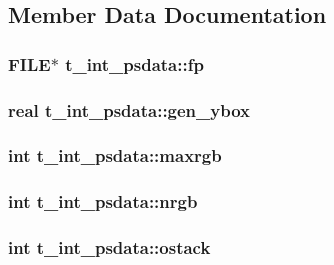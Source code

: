 \subsection{\-Member \-Data \-Documentation}
\hypertarget{structt__int__psdata_a721deeef5b4b3ea353a130fcd3f75b23}{
\subsubsection[{fp}]{\setlength{\rightskip}{0pt plus 5cm}\-F\-I\-L\-E$\ast$ {\bf t\-\_\-int\-\_\-psdata\-::fp}}}\label{structt__int__psdata_a721deeef5b4b3ea353a130fcd3f75b23}
\hypertarget{structt__int__psdata_ad8d5de42bdd642b16f28f3de1a23f2ff}{
\subsubsection[{gen\-\_\-ybox}]{\setlength{\rightskip}{0pt plus 5cm}real {\bf t\-\_\-int\-\_\-psdata\-::gen\-\_\-ybox}}}\label{structt__int__psdata_ad8d5de42bdd642b16f28f3de1a23f2ff}
\hypertarget{structt__int__psdata_aff2dd0eb6e65ee295c467b080add2ab1}{
\subsubsection[{maxrgb}]{\setlength{\rightskip}{0pt plus 5cm}int {\bf t\-\_\-int\-\_\-psdata\-::maxrgb}}}\label{structt__int__psdata_aff2dd0eb6e65ee295c467b080add2ab1}
\hypertarget{structt__int__psdata_a7b319210b0a49cdbacfa04fa54cc2fd1}{
\subsubsection[{nrgb}]{\setlength{\rightskip}{0pt plus 5cm}int {\bf t\-\_\-int\-\_\-psdata\-::nrgb}}}\label{structt__int__psdata_a7b319210b0a49cdbacfa04fa54cc2fd1}
\hypertarget{structt__int__psdata_ad5a08740b4d8d6b7dc253234cec196f2}{
\subsubsection[{ostack}]{\setlength{\rightskip}{0pt plus 5cm}int {\bf t\-\_\-int\-\_\-psdata\-::ostack}}}\label{structt__int__psdata_ad5a08740b4d8d6b7dc253234cec196f2}
